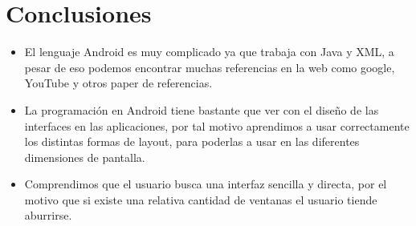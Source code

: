 \documentclass[12pt,oneside]{book}
\begin{document}
\chapter{Conclusiones}
\begin{itemize}
\item El lenguaje Android es  muy complicado ya  que trabaja con  Java y XML, a pesar de eso podemos encontrar muchas referencias en la web como google, YouTube y otros paper de referencias.

\item La programación en Android tiene bastante que ver con el diseño de las interfaces en  las aplicaciones,  por tal motivo aprendimos a usar correctamente los distintas formas de layout, para poderlas a usar en las diferentes dimensiones de pantalla. 

\item Comprendimos que el usuario  busca una interfaz sencilla y directa, por el motivo que si existe una relativa cantidad  de ventanas el usuario tiende aburrirse.

\end{itemize}
\end{document}
